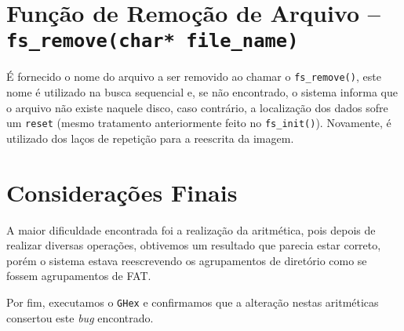 \documentclass[11pt]{article}
\begin{document}
\section{Função de Remoção de Arquivo -- \texttt{fs\_remove(char* file\_name)}}
\par
É fornecido o nome do arquivo a ser removido ao chamar o \texttt{fs\_remove()}, este nome é utilizado na busca sequencial e, se não encontrado, o sistema informa que o arquivo não existe naquele disco, caso contrário, a localização dos dados sofre um \texttt{reset} (mesmo tratamento anteriormente feito no \texttt{fs\_init()}). Novamente, é utilizado dos laços de repetição para a reescrita da imagem.


\section{Considerações Finais}
\par
A maior dificuldade encontrada foi a realização da aritmética, pois depois de realizar diversas operações, obtivemos um resultado que parecia estar correto, porém o sistema estava reescrevendo os agrupamentos de diretório como se fossem agrupamentos de FAT.
\par
Por fim, executamos o \texttt{GHex} e confirmamos que a alteração nestas aritméticas consertou este \textit{bug} encontrado.
\end{document}
